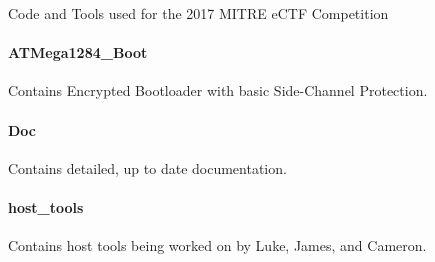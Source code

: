 Code and Tools used for the 2017 M\+I\+T\+RE e\+C\+TF Competition

\paragraph*{A\+T\+Mega1284\+\_\+\+Boot}

Contains Encrypted Bootloader with basic Side-\/\+Channel Protection.

\paragraph*{Doc}

Contains detailed, up to date documentation.

\paragraph*{host\+\_\+tools}

Contains host tools being worked on by Luke, James, and Cameron. 
